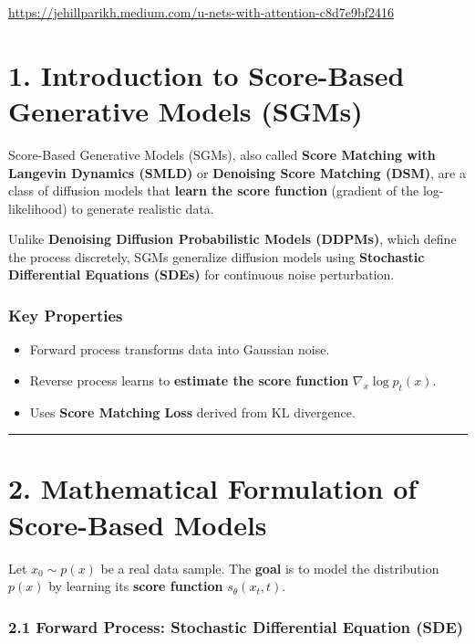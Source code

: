\documentclass[
]{book}
\providecommand{\tightlist}{%
  \setlength{\itemsep}{0pt}\setlength{\parskip}{0pt}}
\begin{document}
\url{https://jehillparikh.medium.com/u-nets-with-attention-c8d7e9bf2416}

\chapter{1. Introduction to Score-Based Generative Models (SGMs)}\label{introduction-to-score-based-generative-models-sgms}

Score-Based Generative Models (SGMs), also called \textbf{Score Matching with Langevin Dynamics (SMLD)} or \textbf{Denoising Score Matching (DSM)}, are a class of diffusion models that \textbf{learn the score function} (gradient of the log-likelihood) to generate realistic data.

Unlike \textbf{Denoising Diffusion Probabilistic Models (DDPMs)}, which define the process discretely, SGMs generalize diffusion models using \textbf{Stochastic Differential Equations (SDEs)} for continuous noise perturbation.

\subsection{\texorpdfstring{\textbf{Key Properties}}{Key Properties}}\label{key-properties}

\begin{itemize}
\tightlist
\item
  Forward process transforms data into Gaussian noise.
\item
  Reverse process learns to \textbf{estimate the score function} \(\nabla_x \log p_t(x)\).
\item
  Uses \textbf{Score Matching Loss} derived from KL divergence.
\end{itemize}

\begin{center}\rule{0.5\linewidth}{0.5pt}\end{center}

\chapter{2. Mathematical Formulation of Score-Based Models}\label{mathematical-formulation-of-score-based-models}

Let \(x_0 \sim p(x)\) be a real data sample. The \textbf{goal} is to model the distribution \(p(x)\) by learning its \textbf{score function} \(s_\theta(x_t, t)\).

\subsection{\texorpdfstring{\textbf{2.1 Forward Process: Stochastic Differential Equation (SDE)}}{2.1 Forward Process: Stochastic Differential Equation (SDE)}}\label{forward-process-stochastic-differential-equation-sde}
\end{document}

